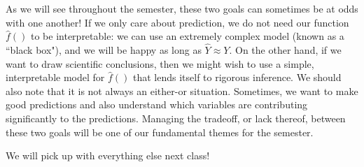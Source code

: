 As we will see throughout the semester, these two goals can sometimes be at odds with one another! If we only care about prediction, we do not need our function $\hat{f}()$ to be interpretable: we can use an extremely complex model (known as a ``black box"), and we will be happy as long as $\hat{Y} \approx Y$. On the other hand, if we want to draw scientific conclusions, then we might wish to use a simple, interpretable model for $\hat{f}()$ that lends itself to rigorous inference. We should also note that it is not always an either-or situation. Sometimes, we want to make good predictions and also understand which variables are contributing significantly to the predictions. Managing the tradeoff, or lack thereof, between these two goals will be one of our fundamental themes for the semester. 

We will pick up with everything else next class!